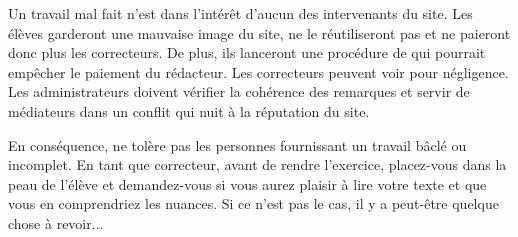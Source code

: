 ﻿Un travail mal fait n'est dans l'intérêt d'aucun des intervenants du site.
Les élèves garderont une mauvaise image du site, ne le réutiliseront pas et ne paieront donc plus les correcteurs. De plus, ils lanceront une procédure de  qui pourrait empêcher le paiement du rédacteur.
Les correcteurs peuvent voir  pour négligence.
Les administrateurs doivent vérifier la cohérence des remarques et servir de médiateurs dans un conflit qui nuit à la réputation du site.

En conséquence, \eDevoir ne tolère pas les personnes fournissant un travail bâclé ou incomplet. En tant que correcteur, avant de rendre l'exercice, placez-vous dans la peau de l'élève et demandez-vous si vous aurez plaisir à lire votre texte et que vous en comprendriez les nuances. Si ce n'est pas le cas, il y a peut-être quelque chose à revoir...
